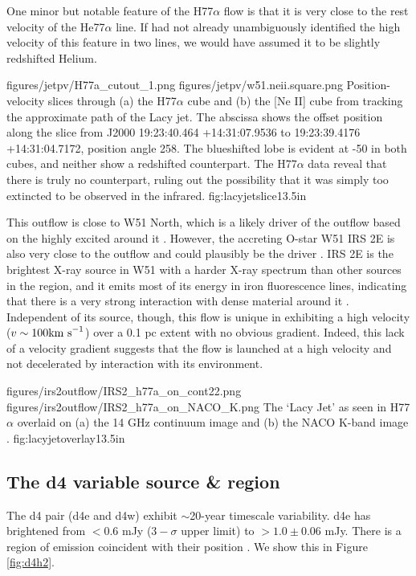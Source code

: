 One minor but notable feature of the H77$\alpha$ flow is that it is very close
to the rest velocity of the He77$\alpha$ line.  If \citet{Lacy2007a} had not
already unambiguously identified the high velocity of this feature in two
lines, we would have assumed it to be slightly redshifted Helium.

\FigureTwo
{figures/jetpv/H77a_cutout_1.png}
{figures/jetpv/w51.neii.square.png}
{Position-velocity slices through (a) the H77$\alpha$ cube and (b) the [Ne II]
cube from \citet{Lacy2007a} tracking the approximate path of the Lacy jet.  The
abscissa shows the offset position along the slice from J2000 19:23:40.464
+14:31:07.9536 to 19:23:39.4176 +14:31:04.7172, position angle 258\arcdeg.
The blueshifted lobe is evident at -50 \kms in both cubes, and neither show a
redshifted counterpart.  The H77$\alpha$ data reveal that there is truly no
counterpart, ruling out the possibility that it was simply too extincted to be
observed in the infrared.}
{fig:lacyjetslice}{1}{3.5in}

This outflow is close to W51 North, which is a likely driver of the outflow based
on the highly excited \ammonia around it \citep{Henkel2013a,Goddi2015a}.  However,
the accreting O-star W51 IRS 2E is also very close to the outflow and could plausibly
be the driver \citep{Barbosa2008a}.  IRS 2E is the brightest X-ray source in
W51 with a harder X-ray spectrum than other sources in the region, and it emits
most of its energy in iron fluorescence lines, indicating that there is a very
strong interaction with dense material around it \citep{Townsley2014a}.
Independent of its source, though, this flow is unique in exhibiting a high
velocity ($v\sim100 \textrm{km~s}^{-1}$) over a 0.1 pc extent with no obvious gradient.
Indeed, this lack of a velocity gradient suggests that the flow is launched
at a high velocity and not decelerated by interaction with its environment.


\FigureTwo
{figures/irs2outflow/IRS2_h77a_on_cont22.png}
{figures/irs2outflow/IRS2_h77a_on_NACO_K.png}
{The `Lacy Jet' as seen in H77$\alpha$ overlaid on (a) the 14 GHz continuum
image and (b) the NACO K-band image \citep{Barbosa2008a}.}
{fig:lacyjetoverlay}{1}{3.5in}

\subsection{The d4 variable source \& \hh region}
The d4 pair (d4e and d4w) exhibit $\sim$20-year timescale variability.  d4e has
brightened from $<0.6$ mJy ($3-\sigma$ upper limit) to $>1.0\pm0.06$ mJy.
There is a region of \hh emission coincident with their position
\citep{Froebrich2011a}.  We show this in Figure \ref{fig:d4h2}.

